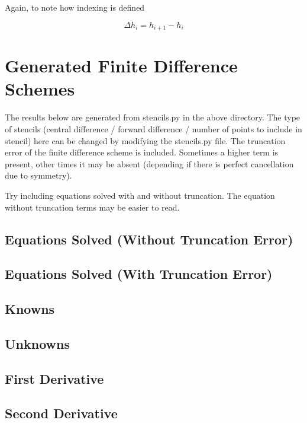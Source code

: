 \documentclass[landscape]{article}
\begin{document}
Again, to note how indexing is defined

\begin{equation}
	\boxed{
	\Delta h_{i}
	=
	h_{i+1} - h_{i}
	}
\end{equation}

\section{Generated Finite Difference Schemes}
The results below are generated from stencils.py in the above directory. The type of stencils (central difference / forward difference / number of points to include in stencil) here can be changed by modifying the stencils.py file. The truncation error of the finite difference scheme is included. Sometimes a higher term is present, other times it may be absent (depending if there is perfect cancellation due to symmetry).

Try including equations solved with and without truncation. The equation without truncation terms may be easier to read.

\subsection{Equations Solved (Without Truncation Error)}

\subsection{Equations Solved (With Truncation Error)}

\subsection{Knowns}

\subsection{Unknowns}

\subsection{First Derivative}

\subsection{Second Derivative}

\end{document}
